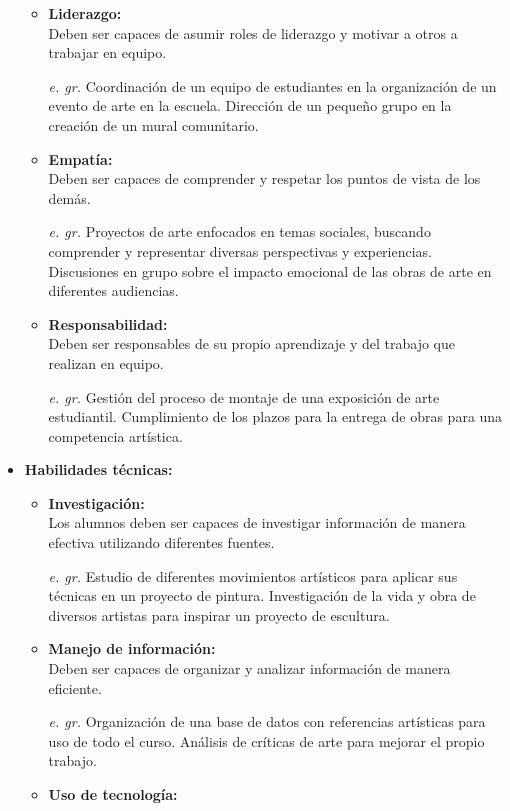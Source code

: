\begin{itemize}
\begin{itemize}
        \item \textbf{Liderazgo:}\\
        Deben ser capaces de asumir roles de liderazgo y motivar a otros a trabajar en equipo.
        \item[\textit{e. gr.}]
        Coordinación de un equipo de estudiantes en la organización de un evento de arte en la escuela. Dirección de un pequeño grupo en la creación de un mural comunitario.
        \item \textbf{Empatía:}\\
         Deben ser capaces de comprender y respetar los puntos de vista de los demás.
         \item[\textit{e. gr.}]
         Proyectos de arte enfocados en temas sociales, buscando comprender y representar diversas perspectivas y experiencias. Discusiones en grupo sobre el impacto emocional de las obras de arte en diferentes audiencias.
         \item \textbf{Responsabilidad: }\\
         Deben ser responsables de su propio aprendizaje y del trabajo que realizan en equipo.
         \item[\textit{e. gr.}]
         Gestión del proceso de montaje de una exposición de arte estudiantil. Cumplimiento de los plazos para la entrega de obras para una competencia artística.
    \end{itemize}
    \item \textbf{Habilidades técnicas:}
    \begin{itemize}
        \item \textbf{Investigación:}\\
        Los alumnos deben ser capaces de investigar información de manera efectiva utilizando diferentes fuentes.
        \item[\textit{e. gr.}]Estudio de diferentes movimientos artísticos para aplicar sus técnicas en un proyecto de pintura. Investigación de la vida y obra de diversos artistas para inspirar un proyecto de escultura.
        \item \textbf{Manejo de información:}\\
         Deben ser capaces de organizar y analizar información de manera eficiente.
         \item[\textit{e. gr.}]
         Organización de una base de datos con referencias artísticas para uso de todo el curso. Análisis de críticas de arte para mejorar el propio trabajo.
         \item \textbf{Uso de tecnología:}\\

\end{itemize}
\end{itemize}
